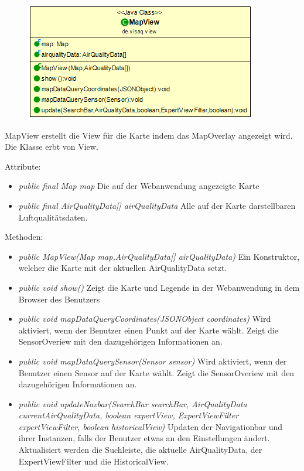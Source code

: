 \begin{minipage}{0.4\textwidth}
    \begin{figure}[H]
        \includegraphics[scale = 0.5]{media/frontend/view/de.view/MapView_Class.png}
    \end{figure}
\end{minipage} \hfill
\begin{minipage}{0.4\textwidth}
    MapView erstellt die View für die Karte indem das MapOverlay angezeigt wird. Die Klasse erbt von View.
\end{minipage}

Attribute:
\begin{itemize}
    \item \emph{public final Map map} Die auf der Webanwendung angezeigte Karte
    \item \emph{public final AirQualityData[] airQualityData} Alle auf der Karte darstellbaren Luftqualitätsdaten.
\end{itemize}
Methoden:
\begin{itemize}
    \item \emph{public MapView(Map map,AirQualityData[] airQualityData)} Ein Konstruktor, welcher die Karte mit der aktuellen AirQualityData setzt.
    \item \emph{public void show()} Zeigt die Karte und Legende in der Webanwendung in dem Browser des Benutzers
    \item \emph{public void mapDataQueryCoordinates(JSONObject coordinates)} Wird aktiviert, wenn der Benutzer einen Punkt auf der Karte wählt. Zeigt die SensorOveriew mit den dazugehörigen Informationen an.
    \item \emph{public void mapDataQuerySensor(Sensor sensor)} Wird aktiviert, wenn der Benutzer einen Sensor auf der Karte wählt. Zeigt die SensorOveriew mit den dazugehörigen Informationen an.
    \item \emph{public void updateNavbar(SearchBar searchBar, AirQualityData currentAirQualityData,
              boolean expertView, ExpertViewFilter expertViewFilter, boolean historicalView)} Updaten der Navigationbar und ihrer Instanzen, falls der Benutzer etwas an den Einstellungen ändert. Aktualisiert werden die Suchleiste, die aktuelle AirQualityData, der ExpertViewFilter und die HistoricalView.
\end{itemize}

